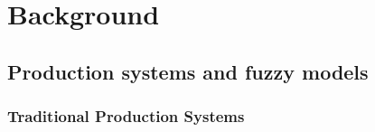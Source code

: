 \chapter{Background}\label{background}
\section{Production systems and fuzzy models}

\subsection{Traditional Production Systems}

